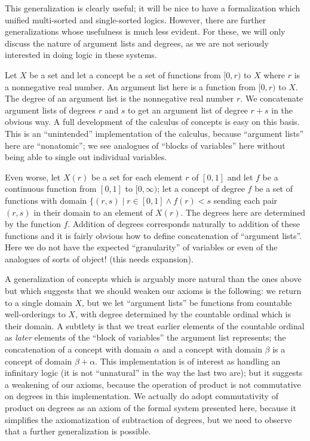 \documentclass{article}
\begin{document}
This generalization is clearly useful; it will be nice to have a
formalization which unified multi-sorted and single-sorted logics.
However, there are further generalizations whose usefulness is much
less evident.  For these, we will only discuss the nature of argument
lists and degrees, as we are not seriously interested in doing logic
in these systems.

Let $X$ be a set and let a concept be a set of functions from $[0,r)$
to $X$ where $r$ is a nonnegative real number.  An argument list here
is a function from $[0,r)$ to $X$.  The degree of an argument list is
the nonnegative real number $r$.  We concatenate argument lists of
degrees $r$ and $s$ to get an argument list of degree $r+s$ in the
obvious way.  A full development of the calculus of concepts is easy
on this basis.  This is an ``unintended'' implementation of the
calculus, because ``argument lists'' here are ``nonatomic''; we see
analogues of ``blocks of variables'' here without being able to single
out individual variables.

Even worse, let $X(r)$ be a set for each element $r$ of $[0,1]$ and
let $f$ be a continuous function from $[0,1]$ to $[0,\infty)$; let a
concept of degree $f$ be a set of functions with domain $\{(r,s)\mid r
\in [0,1] \wedge f(r) < s$ sending each pair $(r,s)$ in their domain
to an element of $X(r)$.  The degrees here are determined by the
function $f$.  Addition of degrees corresponds naturally to addition
of these functions and it is fairly obvious how to define
concatenation of ``argument lists''.  Here we do not have the expected
``granularity'' of variables or even of the analogues of sorts of
object!  (this needs expansion).

A generalization of concepts which is arguably more natural than the
ones above but which suggests that we should weaken our axioms is the
following: we return to a single domain $X$, but we let ``argument
lists'' be functions from countable well-orderings to $X$, with degree
determined by the countable ordinal which is their domain.  A subtlety
is that we treat earlier elements of the countable ordinal as {\em
later\/} elements of the ``block of variables'' the argument list
represents; the concatenation of a concept with domain $\alpha$ and a
concept with domain $\beta$ is a concept of domain $\beta + \alpha$.
This implementation is of interest as handling an infinitary logic (it
is not ``unnatural'' in the way the last two are); but it suggests a
weakening of our axioms, because the operation of product is not
commutative on degrees in this implementation.  We actually do adopt
commutativity of product on degrees as an axiom of the formal system
presented here, because it simplifies the axiomatization of
subtraction of degrees, but we need to observe that a further
generalization is possible.
\end{document}
